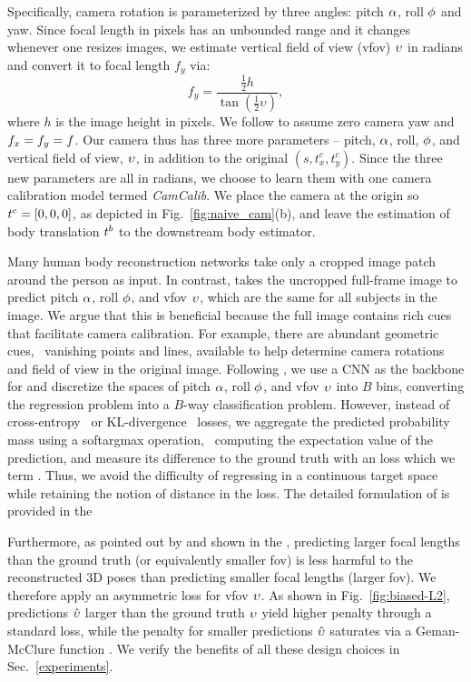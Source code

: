\documentclass[10pt,twocolumn,letterpaper,usenames,dvipsnames]{article}
\begin{document}
Specifically, camera rotation is parameterized by three angles: pitch $\alpha$, roll $\phi$ and yaw. 
Since focal length in pixels has an unbounded range and it changes whenever one resizes images, we estimate vertical field of view (vfov) $\upsilon$ in radians and convert it to focal length $f_y$ via:
\begin{equation}
\label{eq-vfov2fly}
    f_y = \frac{\frac{1}{2}h}{\tan (\frac{1}{2} \upsilon )},
\end{equation}
where $h$ is the image height in pixels.
We follow \cite{zhu2020single} to assume zero camera yaw and $f_x = f_y = f $.
Our camera thus has three more parameters -- pitch, $\alpha$, roll, $\phi$, and vertical field of view, $\upsilon$, in addition to the original $(s, t_x^c, t_y^c)$.
Since the three new parameters are all in radians, we choose to learn them with one camera calibration model termed \emph{CamCalib}. 
We place the camera at the origin so $t^c = [0,0,0]$, as depicted in Fig.~\ref{fig:naive_cam}(b), and leave the estimation of body translation $t^b$ to the downstream body estimator.

Many human body reconstruction networks take only a cropped image patch around the person as input.
In contrast, \camcalib takes the uncropped full-frame image to predict pitch $\alpha$, roll $\phi$, and vfov $\upsilon$, which are the same for all subjects in the image.
We argue that this is beneficial because the full image contains rich cues that facilitate camera calibration. 
For example, there are abundant geometric cues, \eg~vanishing points and lines, available to help determine camera rotations and field of view in the original image. 
Following \cite{Hold-Geoffroy_2018_CVPR,Kendall_2015_ICCV,zhu2020single}, we use a CNN as the backbone for \camcalib and discretize the spaces of pitch $\alpha$, roll $\phi$, and vfov $\upsilon$ into $B$ bins, converting the regression problem into a $B$-way classification problem.
However, instead of cross-entropy~\cite{workman2016horizon} or KL-divergence~\cite{Hold-Geoffroy_2018_CVPR,zhu2020single} losses,
we aggregate the predicted probability mass using a softargmax operation, \ie~computing the expectation value of the prediction, and measure its difference to the ground truth with an \ltwo loss which we term \softltwo. 
Thus, we avoid the difficulty of regressing in a continuous target space while retaining the notion of distance in the loss.
The detailed formulation of \softltwo is provided in the \supmat 

Furthermore, as pointed out by \cite{kissosECCVW2020,yu2020pcls} and shown in the \supmat, predicting larger focal lengths than the ground truth (or equivalently smaller fov) is less harmful to the reconstructed 3D poses than predicting smaller focal lengths (larger fov).
We therefore apply an asymmetric loss for vfov $\upsilon$.
As shown in Fig.~\ref{fig:biased-L2}, 
predictions $\hat{\upsilon}$ larger than the ground truth $\upsilon$ yield higher penalty through a standard \ltwo loss, while the penalty for smaller predictions $\hat{\upsilon}$ saturates via a Geman-McClure function \cite{geman-mcclure}. 
We verify the benefits of all these design choices in Sec.~\ref{experiments}.
\end{document}
